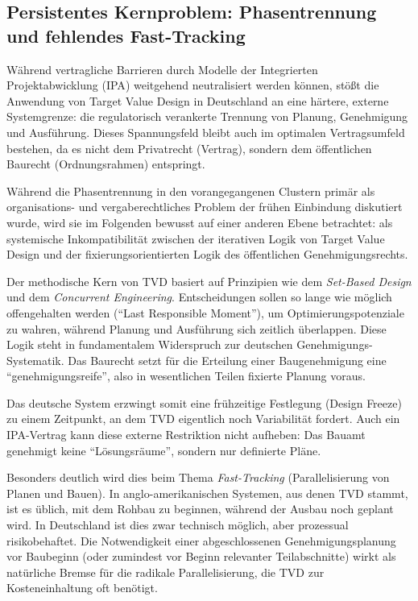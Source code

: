 \subsection{Persistentes Kernproblem: Phasentrennung und fehlendes Fast-Tracking}
\label{sec:5.3.2}

Während vertragliche Barrieren durch Modelle der Integrierten Projektabwicklung (\acs{IPA}) weitgehend neutralisiert werden können, stößt die Anwendung von Target Value Design in Deutschland an eine härtere, externe Systemgrenze: die regulatorisch verankerte Trennung von Planung, Genehmigung und Ausführung. Dieses Spannungsfeld bleibt auch im optimalen Vertragsumfeld bestehen, da es nicht dem Privatrecht (Vertrag), sondern dem öffentlichen Baurecht (Ordnungsrahmen) entspringt.

Während die Phasentrennung in den vorangegangenen Clustern primär als organisations- und vergaberechtliches Problem der frühen Einbindung diskutiert wurde, wird sie im Folgenden bewusst auf einer anderen Ebene betrachtet: als systemische Inkompatibilität zwischen der iterativen Logik von Target Value Design und der fixierungsorientierten Logik des öffentlichen Genehmigungsrechts.

Der methodische Kern von \acs{TVD} basiert auf Prinzipien wie dem \textit{Set-Based Design} und dem \textit{Concurrent Engineering}. Entscheidungen sollen so lange wie möglich offengehalten werden (\enquote{Last Responsible Moment}), um Optimierungspotenziale zu wahren, während Planung und Ausführung sich zeitlich überlappen.
Diese Logik steht in fundamentalem Widerspruch zur deutschen Genehmigungs-Systematik. Das Baurecht setzt für die Erteilung einer Baugenehmigung eine \enquote{genehmigungsreife}, also in wesentlichen Teilen fixierte Planung voraus.

Das deutsche System erzwingt somit eine frühzeitige Festlegung (Design Freeze) zu einem Zeitpunkt, an dem \acs{TVD} eigentlich noch Variabilität fordert. Auch ein \acs{IPA}-Vertrag kann diese externe Restriktion nicht aufheben: Das Bauamt genehmigt keine \enquote{Lösungsräume}, sondern nur definierte Pläne.

Besonders deutlich wird dies beim Thema \textit{Fast-Tracking} (Parallelisierung von Planen und Bauen). In anglo-amerikanischen Systemen, aus denen \acs{TVD} stammt, ist es üblich, mit dem Rohbau zu beginnen, während der Ausbau noch geplant wird. In Deutschland ist dies zwar technisch möglich, aber prozessual risikobehaftet. Die Notwendigkeit einer abgeschlossenen Genehmigungsplanung vor Baubeginn (oder zumindest vor Beginn relevanter Teilabschnitte) wirkt als natürliche Bremse für die radikale Parallelisierung, die \acs{TVD} zur Kosteneinhaltung oft benötigt.\autocite[Vgl.][S.~706]{girmscheid_projektabwicklung_2016}



